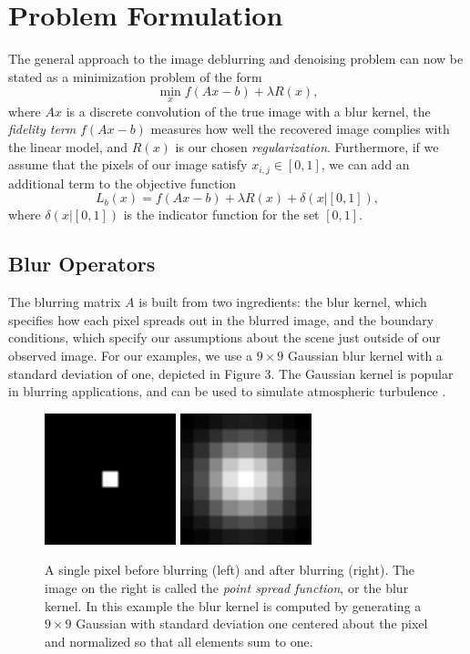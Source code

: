 \documentclass[10pt,a4paper]{article}
\begin{document}
	\section{Problem Formulation}
	The general approach to the image deblurring and denoising problem can now be stated as a minimization problem of the form
	\begin{equation} \label{general}
	\min_x f(Ax -b) + \lambda R(x),
	\end{equation}
	where $Ax$ is a discrete convolution of the true image with a blur kernel, the  \emph{fidelity term} $f(Ax-b)$ measures how well the recovered image complies with the linear model, and $R(x)$ is our chosen \emph{regularization}. Furthermore, if we assume that the pixels of our image satisfy $x_{i,j} \in [0,1]$, we can add an additional term to the objective function
	\begin{equation} \label{loss}
	L_b(x) = f(Ax-b) + \lambda R(x) + \delta(x | [0,1] ),
	\end{equation}
	where $\delta(x | [0,1])$ is the indicator function for the set $[0,1]$. 
	
	\subsection{Blur Operators}
	The blurring matrix $A$ is built from two ingredients: the blur kernel, which specifies how each pixel spreads out in the blurred image, and the boundary conditions, which specify our assumptions about the scene just outside of our observed image. For our examples, we use a $9 \times 9$ Gaussian blur kernel with a standard deviation of one, depicted in Figure 3. The Gaussian kernel is popular in blurring applications, and can be used to simulate atmospheric turbulence \cite{DeblurBook}. 
	
	\begin{figure}[H]
		\centering
		\includegraphics[width=1.5in]{../figures/pixel} \hspace{2em}
		\includegraphics[width=1.5in]{../figures/psf}
		\caption{A single pixel before blurring (left) and after blurring (right). The image on the right is called the \emph{point spread function}, or the blur kernel. In this 	
		example the blur kernel is computed by generating a $9 \times 9$ Gaussian with standard deviation one centered about the pixel and normalized so that all
		elements sum to one.  }
	\end{figure}
	
\end{document}
